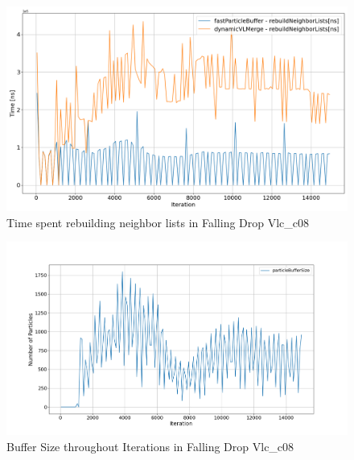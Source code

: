\begin{figure}[htbp]
    \centering
        \includegraphics[width=0.9\linewidth]{graphs/fallingDrop/normalExperiments/freq/vlcc08_neighbour_156.png}
        \vspace{-0.5em}
        \caption{Time spent rebuilding neighbor lists in Falling Drop Vlc\_c08}
        \label{fig:vlcc08_neighbour_156}
\end{figure}

\begin{figure}[htbp]
    \centering
        \includegraphics[width=\linewidth]{graphs/fallingDrop/normalExperiments/freq/vlcc08_buffer_size_156.png}
        \vspace{-0.5em}

        \caption{Buffer Size throughout Iterations in Falling Drop Vlc\_c08}
        \label{fig:vlcc08_buffer_size_156}
\end{figure}



